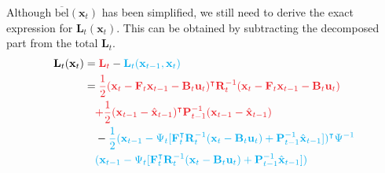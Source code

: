 \documentclass[10pt]{article}
\begin{document}
Although $\overline{\text{bel}}(\mathbf{x}_{t})$ has been simplified, we still need to derive the exact expression for $\mathbf{L}_t(\mathbf{x}_t)$. This can be obtained by subtracting the decomposed part from the total $\mathbf{L}_t$.
\begin{equation}
	\begin{aligned}
		\mathbf{L}_t(\mathbf{x}_t) & = {\color{Red}  \mathbf{L}_t }- {\color{Cyan} \mathbf{L}_t(\mathbf{x}_{t-1}, \mathbf{x}_t) } \\
		& = {\color{Red}  \frac{1}{2}(\mathbf{x}_t - \mathbf{F}_t\mathbf{x}_{t-1}-\mathbf{B}_t\mathbf{u}_t)^{\intercal} \mathbf{R}_t^{-1}(\mathbf{x}_t - \mathbf{F}_t\mathbf{x}_{t-1}-\mathbf{B}_t\mathbf{u}_t) } \\
		& \quad{\color{Red}  +  \frac{1}{2}(\mathbf{x}_{t-1} - \hat{\mathbf{x}}_{t-1})^{\intercal} \mathbf{P}_{t-1}^{-1}(\mathbf{x}_{t-1} - \hat{\mathbf{x}}_{t-1}) } \\
		& \quad - {\color{Cyan}  \frac{1}{2}(\mathbf{x}_{t-1} - \Psi_t[ \mathbf{F}_t^{\intercal}\mathbf{R}_t^{-1}(\mathbf{x}_t - \mathbf{B}_t \mathbf{u}_t) + \mathbf{P}_{t-1}^{-1}\hat{\mathbf{x}}_{t-1} ])^{\intercal} \Psi^{-1} } \\
		& \quad {\color{Cyan} (\mathbf{x}_{t-1} - \Psi_t[ \mathbf{F}_t^{\intercal}\mathbf{R}_t^{-1}(\mathbf{x}_t - \mathbf{B}_t \mathbf{u}_t) + \mathbf{P}_{t-1}^{-1}\hat{\mathbf{x}}_{t-1} ]) }
	\end{aligned}
\end{equation}
\end{document}
